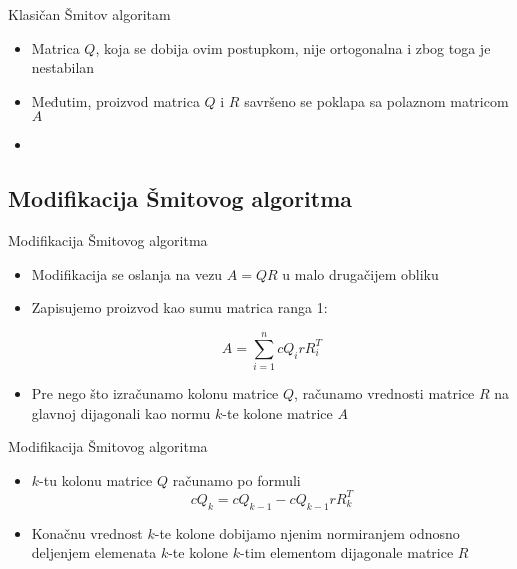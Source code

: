 \documentclass[serbian]{beamer}
\begin{document}
\begin{frame}{Klasičan Šmitov algoritam}
	
	\begin{itemize}
		\item Matrica $Q$, koja se dobija ovim postupkom, nije ortogonalna i zbog toga je nestabilan
		\item Međutim, proizvod matrica $Q$ i $R$ savršeno se poklapa sa polaznom matricom $A$
		\item 
	\end{itemize}
	
\end{frame}

\subsection{Modifikacija Šmitovog algoritma}
\begin{frame}{Modifikacija Šmitovog algoritma}

	\begin{itemize}
		\item Modifikacija se oslanja na vezu $A = QR$ u malo drugačijem obliku
		\item Zapisujemo proizvod kao sumu matrica ranga 1:
		
		$$A = \sum_{i=1}^{n} cQ_irR_i^T $$
		
		\item Pre nego što izračunamo kolonu matrice $Q$, računamo vrednosti matrice $R$ na glavnoj dijagonali kao normu $k$-te kolone matrice $A$	
	\end{itemize}

\end{frame}

\begin{frame}{Modifikacija Šmitovog algoritma}

	\begin{itemize}
		\item $k$-tu kolonu matrice $Q$ računamo po formuli
		$$cQ_k = cQ_{k-1} - cQ_{k-1}rR_k^T$$
		\item Konačnu vrednost $k$-te kolone dobijamo njenim normiranjem odnosno deljenjem elemenata $k$-te kolone $k$-tim elementom dijagonale matrice $R$	
	\end{itemize}
\end{frame}
\end{document}
